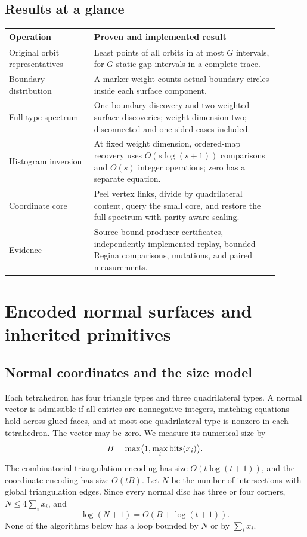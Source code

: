 \subsection{Results at a glance}

\begin{center}
\begin{tabular}{p{0.29\linewidth}p{0.61\linewidth}}
\toprule
Operation & Proven and implemented result\\
\midrule
Original orbit representatives & Least points of all orbits in at most $G$
intervals, for $G$ static gap intervals in a complete trace.\\
Boundary distribution & A marker weight counts actual boundary circles inside
each surface component.\\
Full type spectrum & One boundary discovery and two weighted surface discoveries;
weight dimension two; disconnected and one-sided cases included.\\
Histogram inversion & At fixed weight dimension, ordered-map recovery uses
$O(s\log(s+1))$ comparisons and $O(s)$ integer operations; zero has a
separate equation.\\
Coordinate core & Peel vertex links, divide by quadrilateral content, query the
small core, and restore the full spectrum with parity-aware scaling.\\
Evidence & Source-bound producer certificates, independently implemented replay,
bounded Regina comparisons, mutations, and paired measurements.\\
\bottomrule
\end{tabular}
\end{center}

\section{Encoded normal surfaces and inherited primitives}
\label{sec:model}

\subsection{Normal coordinates and the size model}

Each tetrahedron has four triangle types and three quadrilateral types. A
normal vector is admissible if all entries are nonnegative integers, matching
equations hold across glued faces, and at most one quadrilateral type is
nonzero in each tetrahedron. The vector may be zero. We measure its numerical
size by
\[
 B=\max\bigl(1,\max_i\operatorname{bits}(x_i)\bigr).
\]
The combinatorial triangulation encoding has size $O(t\log(t+1))$, and the
coordinate encoding has size $O(tB)$. Let $N$ be the number of intersections
with global triangulation edges. Since every normal disc has three or four
corners, $N\le4\sum_i x_i$, and
\[
 \log(N+1)=O(B+\log(t+1)).
\]
None of the algorithms below has a loop bounded by $N$ or by $\sum_i x_i$.

